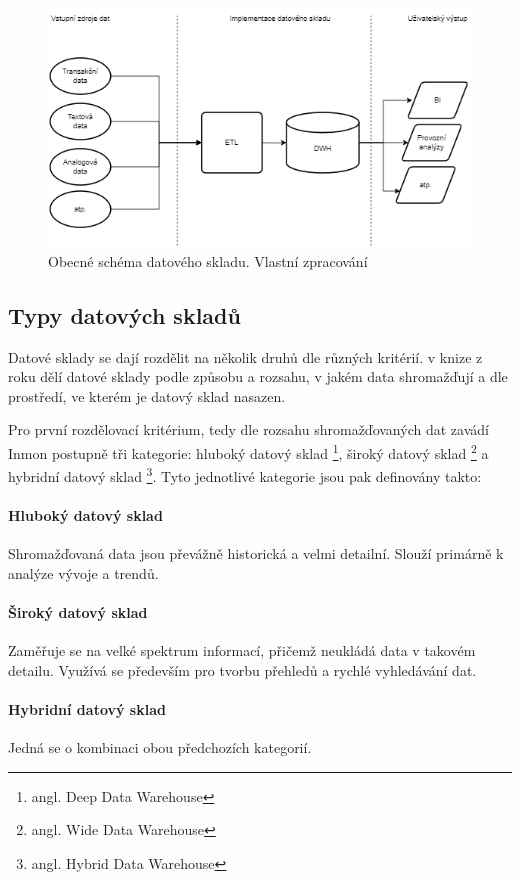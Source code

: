 \documentclass[
  digital,     %
  twoside,     %
  lof,         %
  lot,         %
]{fithesis4}
\begin{document}
\begin{figure}[h]
  \begin{center}
          \includegraphics[width=12cm]{img/dwh_schma.png}
  \end{center}
  \caption{Obecné schéma datového skladu. Vlastní zpracování}
  \label{fig:dwh_schema}
\end{figure}  

\subsection{Typy datových skladů}
\label{dwh_types}
Datové sklady se dají rozdělit na několik druhů dle různých kritérií. \citeauthor{Inmon2005}
v knize  z roku \citeyear{Inmon2005} dělí datové sklady podle způsobu a rozsahu,
v jakém data shromažďují a dle prostředí, ve kterém je datový sklad nasazen.

Pro první rozdělovací kritérium, tedy dle rozsahu shromažďovaných dat zavádí Inmon
postupně tři kategorie: hluboký datový sklad \footnote{angl. Deep Data Warehouse}, široký
datový sklad \footnote{angl. Wide Data Warehouse} a hybridní datový sklad \footnote{angl. Hybrid Data
Warehouse}. Tyto jednotlivé kategorie jsou pak definovány takto:
\paragraph{Hluboký datový sklad}
Shromažďovaná data jsou převážně historická a velmi detailní. Slouží primárně k analýze vývoje a trendů.
\paragraph{Široký datový sklad}
Zaměřuje se na velké spektrum informací, přičemž neukládá data v takovém detailu. Využívá se především pro tvorbu přehledů a rychlé vyhledávání dat.
\paragraph{Hybridní datový sklad}
Jedná se o kombinaci obou předchozích kategorií.
\end{document}
